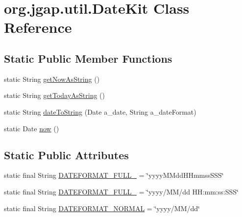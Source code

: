 \hypertarget{classorg_1_1jgap_1_1util_1_1_date_kit}{\section{org.\-jgap.\-util.\-Date\-Kit Class Reference}
\label{classorg_1_1jgap_1_1util_1_1_date_kit}
}
\subsection*{Static Public Member Functions}
\begin{DoxyCompactItemize}
\item 
static String \hyperlink{classorg_1_1jgap_1_1util_1_1_date_kit_a56347c8fe3d5dcaf5567249c7a509f7e}{get\-Now\-As\-String} ()
\item 
static String \hyperlink{classorg_1_1jgap_1_1util_1_1_date_kit_a22c7fec9a17d3afe548f7d3e9a1a755e}{get\-Today\-As\-String} ()
\item 
static String \hyperlink{classorg_1_1jgap_1_1util_1_1_date_kit_a81991a20ddb5678e1a0ea05d0f1e12e1}{date\-To\-String} (Date a\-\_\-date, String a\-\_\-date\-Format)
\item 
static Date \hyperlink{classorg_1_1jgap_1_1util_1_1_date_kit_ac8b5fe618846f967af7f726e23ef9f0e}{now} ()
\end{DoxyCompactItemize}
\subsection*{Static Public Attributes}
\begin{DoxyCompactItemize}
\item 
static final String \hyperlink{classorg_1_1jgap_1_1util_1_1_date_kit_ab54ce445a14668d8045a3952f2293622}{D\-A\-T\-E\-F\-O\-R\-M\-A\-T\-\_\-\-F\-U\-L\-L\-\_} = \char`\"{}yyyy\-M\-Mdd\-H\-Hmmss\-S\-S\-S\char`\"{}
\item 
static final String \hyperlink{classorg_1_1jgap_1_1util_1_1_date_kit_a65db97cf5c49ed0c7716d09621f3e0c3}{D\-A\-T\-E\-F\-O\-R\-M\-A\-T\-\_\-\-F\-U\-L\-L\-\_} = \char`\"{}yyyy/M\-M/dd H\-H\-:mm\-:ss\-:\-S\-S\-S\char`\"{}
\item 
static final String \hyperlink{classorg_1_1jgap_1_1util_1_1_date_kit_af6ae28529731d6ab17dd2899f35a52a6}{D\-A\-T\-E\-F\-O\-R\-M\-A\-T\-\_\-\-N\-O\-R\-M\-A\-L} = \char`\"{}yyyy/M\-M/dd\char`\"{}
\end{DoxyCompactItemize}
